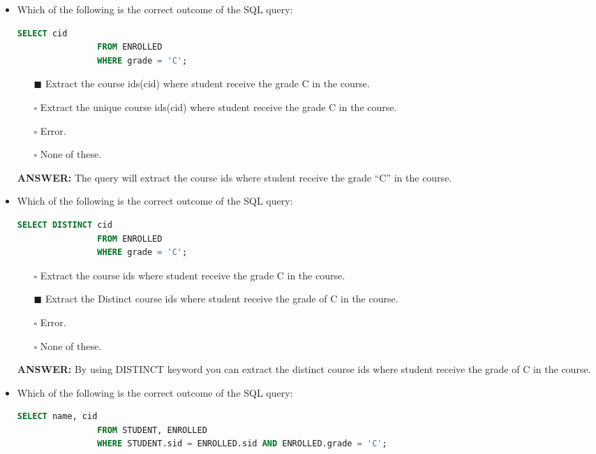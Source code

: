 \documentclass[10pt]{article}
\begin{document}
\begin{itemize}
		\item Which of the following is the correct outcome of the SQL query: 
			\begin{lstlisting}[language=SQL,firstline=1, lastline=3]
				SELECT cid 
				FROM ENROLLED 
				WHERE grade = 'C';
			\end{lstlisting}

			\begin{enumerate}
				\item[$\blacksquare$] Extract the course ids(cid) where student receive the grade C in the course.
				\item[$\square$] Extract the unique course ids(cid) where student receive the grade C in the course.
				\item[$\square$] Error.
				\item[$\square$] None of these.
			\end{enumerate}
			\color{red} \textbf{ANSWER:} \color{black} The query will extract the course ids where student receive the grade “C” in the course.
			
		\item Which of the following is the correct outcome of the SQL query: 
			\begin{lstlisting}[language=SQL,firstline=1, lastline=3]
				SELECT DISTINCT cid 
				FROM ENROLLED 
				WHERE grade = 'C';
			\end{lstlisting}

			\begin{enumerate}
				\item[$\square$] Extract the course ids where student receive the grade C in the course.
				\item[$\blacksquare$] Extract the Distinct course ids where student receive the grade of C in the course.
				\item[$\square$] Error.
				\item[$\square$] None of these.
			\end{enumerate}
			\color{red} \textbf{ANSWER:} \color{black} By using DISTINCT keyword you can extract the distinct course ids where student receive the grade of C in the course.
		
		\newpage

		\item Which of the following is the correct outcome of the SQL query: 
			\begin{lstlisting}[language=SQL,firstline=1, lastline=3]
				SELECT name, cid 
				FROM STUDENT, ENROLLED 
				WHERE STUDENT.sid = ENROLLED.sid AND ENROLLED.grade = 'C';
			\end{lstlisting}
		

\end{itemize}
\end{document}
